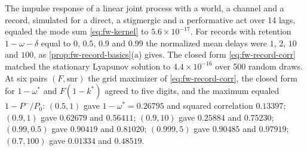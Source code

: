 \begin{numcheck}\label{chk:fw-records}
The impulse response of a linear joint process with a world, a channel and a record, simulated for a direct, a stigmergic and a performative act over 14 lags, equaled the mode sum \eqref{eq:fw-kernel} to $5.6\times10^{-17}$. For records with retention $1-\omega-\delta$ equal to $0$, $0.5$, $0.9$ and $0.99$ the normalized mean delays were $1$, $2$, $10$ and $100$, as \cref{prop:fw-record-basics}(a) gives. The closed form \eqref{eq:fw-record-corr} matched the stationary Lyapunov solution to $4.4\times10^{-16}$ over 500 random draws. At six pairs $(F,\mathrm{snr})$ the grid maximizer of \eqref{eq:fw-record-corr}, the closed form for $1-\omega^\ast$ and $F(1-k^\ast)$ agreed to five digits, and the maximum equaled $1-P^-/P_0$: $(0.5,1)$ gave $1-\omega^\ast=0.26795$ and squared correlation $0.13397$; $(0.9,1)$ gave $0.62679$ and $0.56411$; $(0.9,10)$ gave $0.25884$ and $0.75230$; $(0.99,0.5)$ gave $0.90419$ and $0.81020$; $(0.999,5)$ gave $0.90485$ and $0.97919$; $(0.7,100)$ gave $0.01334$ and $0.48519$.
\end{numcheck}

